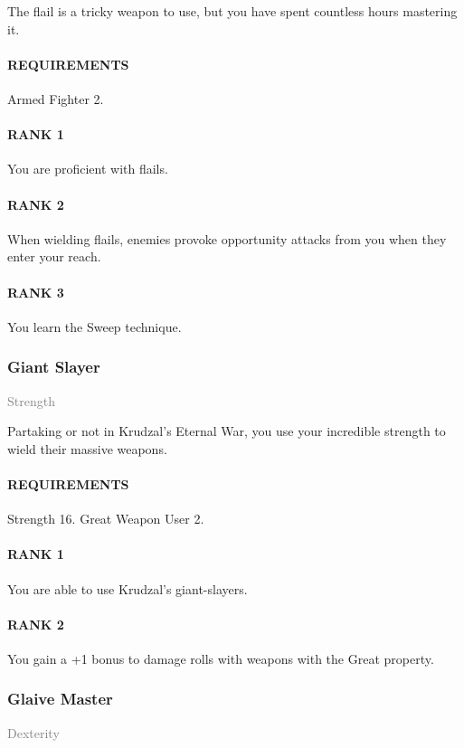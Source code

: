 \normalsize
The flail is a tricky weapon to use, but you have spent countless hours mastering it.
\paragraph{REQUIREMENTS} Armed Fighter 2.
\paragraph{RANK 1} You are proficient with flails.
\paragraph{RANK 2} When wielding flails, enemies provoke opportunity attacks from you when they enter your reach.
\paragraph{RANK 3} You learn the Sweep technique.

\subsubsection{Giant Slayer} \label{feat::giantslayer}
\small{\textcolor{gray}{Strength}}

\normalsize
Partaking or not in Krudzal's Eternal War, you use your incredible strength to wield their massive weapons.
\paragraph{REQUIREMENTS} Strength 16. Great Weapon User 2.
\paragraph{RANK 1} You are able to use Krudzal's giant-slayers.
\paragraph{RANK 2} You gain a +1 bonus to damage rolls with weapons with the Great property.

\subsubsection{Glaive Master} \label{feat::glaivemaster}
\small{\textcolor{gray}{Dexterity}}

